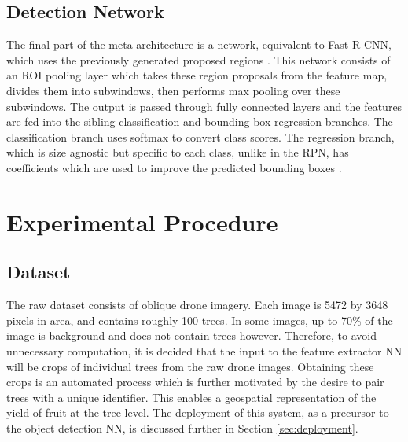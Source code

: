 \documentclass[journal]{IEEEtran}
\begin{document}
\subsection{Detection Network}

The final part of the meta-architecture is a network, equivalent to Fast R-CNN, which uses the previously generated proposed regions \cite{fastrcnn}. This network consists of an ROI pooling layer which takes these region proposals from the feature map, divides them into subwindows, then performs max pooling over these subwindows. The output is passed through fully connected layers and the features are fed into the sibling classification and bounding box regression branches. The classification branch uses softmax to convert class scores. The regression branch, which is size agnostic but specific to each class, unlike in the RPN, has coefficients which are used to improve the predicted bounding boxes \cite{objectdetectionatechnicalsummary}.






















\section{Experimental Procedure}\label{experimental_procedure}


\subsection{Dataset}

The raw dataset consists of oblique drone imagery. Each image is 5472 by 3648 pixels in area, and contains roughly 100 trees. In some images, up to 70\% of the image is background and does not contain trees however. Therefore, to avoid unnecessary computation, it is decided that the input to the feature extractor NN will be crops of individual trees from the raw drone images. Obtaining these crops is an automated process which is further motivated by the desire to pair trees with a unique identifier. This enables a geospatial representation of the yield of fruit at the tree-level. The deployment of this system, as a precursor to the object detection NN, is discussed further in Section \ref{sec:deployment}. 
\end{document}
